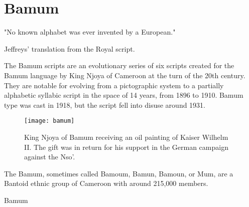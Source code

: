 \chapter{Bamum}
\label{s:bamum}
\epigraph{"No known alphabet was ever invented by a European."}{Jeffreys' translation from the Royal script.}

\label{s:bamum}
\newfontfamily{}

The Bamum scripts are an evolutionary series of six scripts created for the Bamum language by King Njoya of Cameroon at the turn of the 20th century. They are notable for evolving from a pictographic system to a partially alphabetic syllabic script in the space of 14 years, from 1896 to 1910. Bamum type was cast in 1918, but the script fell into disuse around 1931.

\begin{figure}[htbp]
\parindent=0pt

\centering

\texttt{[image: bamum]}

\caption{King Njoya of Bamum receiving an oil painting of Kaiser Wilhelm II. The gift was in return for his support in the German campaign against the Nso'.}
\end{figure}

The Bamum, sometimes called Bamoum, Bamun, Bamoun, or Mum, are a Bantoid ethnic group of Cameroon with around 215,000 members.



\begin{scriptexample}[]{Bamum}
\end{scriptexample}